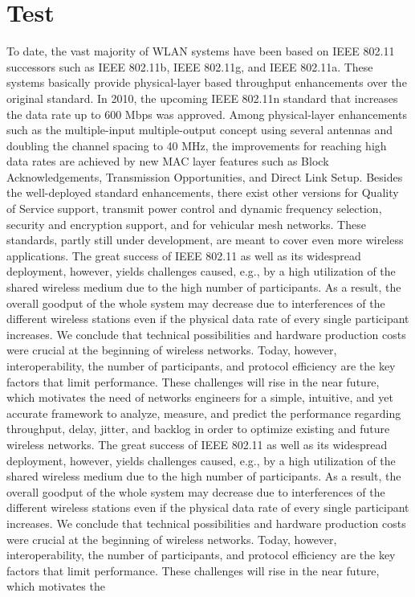 \section{Test}
\newpage

To date, the vast majority of WLAN systems have been based on IEEE 802.11 successors such as IEEE 802.11b, IEEE 802.11g, and IEEE 802.11a. These systems basically provide physical-layer based throughput enhancements over the original standard. In 2010, the upcoming IEEE 802.11n standard that increases the data rate up to 600 Mbps was approved. Among physical-layer enhancements such as the multiple-input multiple-output  concept using several antennas and doubling the channel spacing to 40 MHz, the improvements for reaching high data rates are achieved by new MAC layer features such as Block Acknowledgements, Transmission Opportunities, and Direct Link Setup. Besides the well-deployed standard enhancements, there exist other versions for Quality of Service support, transmit power control and dynamic frequency selection, security and encryption support, and for vehicular mesh networks. These standards, partly still under development, are meant to cover even more wireless applications. The great success of IEEE 802.11 as well as its widespread deployment, however, yields challenges caused, e.g., by a high utilization of the shared wireless medium due to the high number of participants. As a result, the overall goodput of the whole system may decrease due to interferences of the different wireless stations even if the physical data rate of every single participant increases. We conclude that technical possibilities and hardware production costs were crucial at the beginning of wireless networks. Today, however, interoperability, the number of participants, and protocol efficiency are the key factors that limit performance. These challenges will rise in the near future, which motivates the need of networks engineers for a simple, intuitive, and yet accurate framework to analyze, measure, and predict the performance regarding throughput, delay, jitter, and backlog in order to optimize existing and future wireless networks. The great success of IEEE 802.11 as well as its widespread deployment, however, yields challenges caused, e.g., by a high utilization of the shared wireless medium due to the high number of participants. As a result, the overall goodput of the whole system may decrease due to interferences of the different wireless stations even if the physical data rate of every single participant increases. We conclude that technical possibilities and hardware production costs were crucial at the beginning of wireless networks. Today, however, interoperability, the number of participants, and protocol efficiency are the key factors that limit performance. These challenges will rise in the near future, which motivates the 
